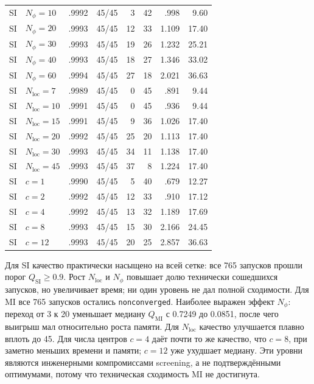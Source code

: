 \documentclass[11pt,a4paper]{article}
\newcommand{\code}[1]{\texttt{#1}}
\newcommand{\qsi}{Q_{\mathrm{SI}}}
\newcommand{\qmi}{Q_{\mathrm{MI}}}
\begin{document}
\begin{longtable}{llrrrrrr}
SI & $N_\phi=10$ & .9992 & 45/45 & 3  & 42 & .998 & 9.60 \\
SI & $N_\phi=20$ & .9993 & 45/45 & 12 & 33 & 1.109 & 17.40 \\
SI & $N_\phi=30$ & .9993 & 45/45 & 19 & 26 & 1.232 & 25.21 \\
SI & $N_\phi=40$ & .9993 & 45/45 & 18 & 27 & 1.346 & 33.02 \\
SI & $N_\phi=60$ & .9994 & 45/45 & 27 & 18 & 2.021 & 36.63 \\
\midrule
SI & $N_{\mathrm{loc}}=7$  & .9989 & 45/45 & 0  & 45 & .891 & 9.44 \\
SI & $N_{\mathrm{loc}}=10$ & .9991 & 45/45 & 0  & 45 & .936 & 9.44 \\
SI & $N_{\mathrm{loc}}=15$ & .9991 & 45/45 & 9  & 36 & 1.026 & 17.40 \\
SI & $N_{\mathrm{loc}}=20$ & .9992 & 45/45 & 25 & 20 & 1.113 & 17.40 \\
SI & $N_{\mathrm{loc}}=30$ & .9993 & 45/45 & 34 & 11 & 1.138 & 17.40 \\
SI & $N_{\mathrm{loc}}=45$ & .9993 & 45/45 & 37 & 8  & 1.224 & 17.40 \\
\midrule
SI & $c=1$  & .9990 & 45/45 & 5  & 40 & .679 & 12.27 \\
SI & $c=2$  & .9992 & 45/45 & 12 & 33 & .910 & 17.12 \\
SI & $c=4$  & .9992 & 45/45 & 13 & 32 & 1.189 & 17.69 \\
SI & $c=8$  & .9993 & 45/45 & 15 & 30 & 2.166 & 24.45 \\
SI & $c=12$ & .9993 & 45/45 & 20 & 25 & 2.857 & 36.63 \\
\bottomrule
\end{longtable}

Для SI качество практически насыщено на всей сетке: все 765 запусков прошли
порог $\qsi\geq0.9$. Рост $N_{\mathrm{loc}}$ и $N_\phi$ повышает долю
технически сошедшихся запусков, но увеличивает время; ни один уровень не дал
полной сходимости. Для MI все 765 запусков остались \code{nonconverged}.
Наиболее выражен эффект $N_\phi$: переход от 3 к 20 уменьшает медиану
$\qmi$ с 0.7249 до 0.0851, после чего выигрыш мал относительно роста памяти.
Для $N_{\mathrm{loc}}$ качество улучшается плавно вплоть до 45. Для числа
центров $c=4$ даёт почти то же качество, что $c=8$, при заметно меньших
времени и памяти; $c=12$ уже ухудшает медиану. Эти уровни являются
инженерными компромиссами screening, а не подтверждёнными оптимумами, потому
что техническая сходимость MI не достигнута.
\end{document}
